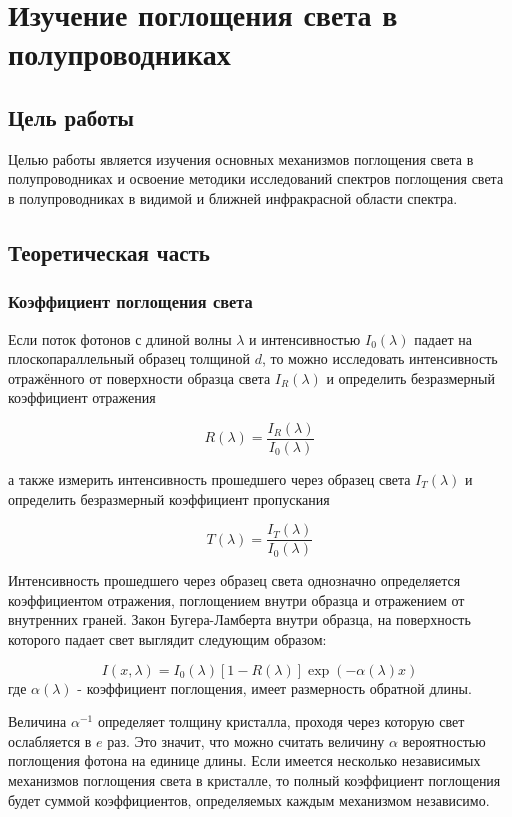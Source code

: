 \chapter{Изучение поглощения света в полупроводниках}

\section{Цель работы}
Целью работы является изучения основных механизмов поглощения света в полупроводниках и освоение методики исследований спектров поглощения света в полупроводниках в видимой и ближней инфракрасной области спектра.

\section{Теоретическая часть}
\subsection{Коэффициент поглощения света}
Если поток фотонов с длиной волны $\lambda$ и интенсивностью $I_{0}(\lambda)$ падает на плоскопараллельный образец толщиной $d$, то можно исследовать интенсивность отражённого от поверхности образца света $I_{R}(\lambda)$ и определить безразмерный коэффициент отражения

\begin{equation}
R(\lambda) = \frac{I_{R}(\lambda)}{I_{0}(\lambda)}
\end{equation}

а также измерить интенсивность прошедшего через образец света $I_{T}(\lambda)$ и определить безразмерный коэффициент пропускания

\begin{equation}
T(\lambda) = \frac{I_{T}(\lambda)}{I_{0}(\lambda)}
\end{equation}

Интенсивность прошедшего через образец света однозначно определяется коэффициентом отражения, поглощением внутри образца и отражением от внутренних граней. Закон Бугера-Ламберта внутри образца, на поверхность которого падает свет выглядит следующим образом:

\begin{equation}
I(x, \lambda) = I_{0}(\lambda) \left[ 1 - R(\lambda) \right] \exp{(- \alpha (\lambda) x )}
\end{equation}
где $\alpha(\lambda)$ - коэффициент поглощения, имеет размерность обратной длины.

Величина $\alpha^{-1}$ определяет толщину кристалла, проходя через которую свет ослабляется в $e$ раз. Это значит, что можно считать величину $\alpha$ вероятностью поглощения фотона на единице длины. Если имеется несколько независимых механизмов поглощения света в кристалле, то полный коэффициент поглощения будет суммой коэффициентов, определяемых каждым механизмом независимо.

